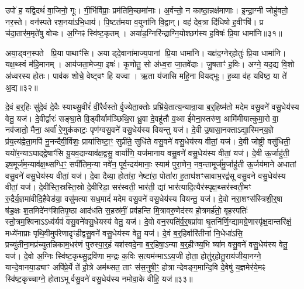 उपो॑ ह॒ यद्वि॒दथं॑ वा॒जिनो॒ गूः।
गी॒र्भिर्विप्राः॒ प्रम॑तिमि॒च्छमा॑नाः।
अ॒र्वन्तो॒ न काष्ठा॒न्नक्ष॑माणाः।
इ॒न्द्रा॒ग्नी जोहु॑वतो॒ नर॒स्ते।
वन॑स्पते रश॒नया॑\-ऽभि॒धाय॑।
पि॒ष्टत॑मया व॒युना॑नि वि॒द्वान्।
वह॑ देव॒त्रा दि॑धिषो ह॒वीꣳषि॑।
प्र च॑दा॒तार॑म॒मृते॑षु वोचः।
अ॒ग्निꣴ स्वि॑ष्ट॒कृतम्।
अया॑ड॒ग्निरि॑न्द्राग्नि॒योश्छग॑स्य ह॒विषः॑ प्रि॒या धामा॑नि॥३१॥

अया॒ड्वन॒स्पते प्रि॒या पाथाꣳ॑सि।
अयाड्दे॒वाना॑माज्य॒पानां प्रि॒या धामा॑नि।
यक्ष॑द॒ग्नेर्‌\mbox{}होतुः॑ प्रि॒या धामा॑नि।
यक्ष॒थ्स्वं म॑हि॒मानम्।
आय॑जता॒मेज्या॒ इषः॑।
कृ॒णोतु॒ सो अ॑ध्व॒रा जा॒तवे॑दाः।
जु॒षताꣳ॑ ह॒विः।
अग्ने॒ यद॒द्य वि॒शो अ॑ध्वरस्य होतः।
पाव॑क शोचे॒ वेष्ट्वꣳ हि यज्वा।
ऋ॒ता य॑जासि महि॒ना वियद्भूः।
ह॒व्या व॑ह यविष्ठ॒ या ते॑ अ॒द्य॥३२॥\anuvakamend[धामा॑नि॒ भूरेकं॑ च]

दे॒वं ब॒र्॒हिः सु॑दे॒वं दे॒वैः स्याथ्सु॒वीरं॑ वी॒रैर्वस्तोर्वृ॒ज्येता॒क्तोः प्रभ्रि॑ये॒तात्य॒न्यान्रा॒या ब॒र्॒हिष्म॑तो मदेम वसु॒वने॑ वसु॒धेय॑स्य वेतु॒ यज॑।
दे॒वीर्द्वारः॑ सङ्घा॒ते वि॒ड्वीर्याम॑ञ्छिथि॒रा ध्रु॒वा दे॒वहू॑तौ व॒थ्स ई॑मेना॒स्तरु॑ण॒ आमि॑मीयात्कुमा॒रो वा॒ नव॑जातो॒ मैना॒ अर्वा॑ रे॒णुक॑काटः॒ पृण॑ग्वसु॒वने॑ वसु॒धेय॑स्य वियन्तु यज॑।
दे॒वी उ॒षासा॒नक्ता\-ऽद्या॒स्मिन्‌य॒ज्ञे प्र॑य॒त्य॑ह्वेता॒मपि॑ नू॒नन्दैवी॒र्विशः॒ प्राया॑सिष्टा॒ꣳ॒ सुप्री॑ते॒ सुधि॑ते वसु॒वने॑ वसु॒धेय॑स्य वीतां॒ यज॑।
दे॒वी जोष्ट्री॒ वसु॑धिती॒ ययो॑र॒न्या\-ऽघाद्द्वेषाꣳ॑सि यू॒यव॒दान्याव॑क्ष॒द्वसु॒ वार्या॑णि॒ यज॑मानाय वसु॒वने॑ वसु॒धेय॑स्य वीतां॒ यज॑।
दे॒वी ऊ॒र्जाहु॑ती॒ इष॒मूर्ज॑म॒न्याव॑क्ष॒थ्सग्धि॒ꣳ॒ सपी॑तिम॒न्या नवे॑न॒ पूर्व॒न्दय॑मानाः॒ स्याम॑ पुरा॒णेन॒ नव॒न्तामूर्ज॑मू॒र्जाहु॑ती ऊ॒र्जय॑माने अधातां वसु॒वने॑ वसु॒धेय॑स्य वीतां॒ यज॑।
दे॒वा दैव्या॒ होता॑रा॒ नेष्टा॑रा॒ पोता॑रा ह॒ताघ॑शꣳसावाभ॒रद्व॑सू वसु॒वने वसु॒धेय॑स्य वीतां॒ यज॑।
दे॒वीस्ति॒स्रस्ति॒स्रो दे॒वीरिडा॒ सर॑स्वती॒ भार॑ती॒ द्यां भार॑त्यादि॒त्यैर॑स्पृक्ष॒थ्सर॑स्वती॒मꣳ रु॒द्रैर्य॒ज्ञमा॑वीदि॒हैवेड॑या॒ वसु॑मत्या सध॒मादं॑ मदेम वसु॒वने॑ वसु॒धेय॑स्य वियन्तु॒ यज॑।
दे॒वो नरा॒शꣳस॑स्त्रिशी॒र्॒षा ष॑ड॒क्षः श॒तमिदे॑नꣳशितिपृ॒ष्ठा आद॑धति स॒हस्र॑मीं॒ प्रव॑हन्ति मि॒त्रावरु॒णेद॑स्य हो॒त्रमर्\mbox{}ह॑तो॒ बृह॒स्पतिः॑ स्तो॒त्रम॒श्विना\-ऽऽध्व॑र्यवं वसु॒वने॑वसु॒धेयस्य॑ वेतु॒ यज॑।
दे॒वो वन॒स्पति॑र्व॒र्॒षप्रा॑वा घृ॒तनि॑र्णि॒ग्द्यामग्रे॒णास्पृ॑क्ष॒दान्तरि॑क्षं॒ मध्ये॑नाप्राः पृथि॒वीमुप॑रेणादृꣳहीद्वसु॒वने॑ वसु॒धेय॑स्य वेतु॒ यज॑।
दे॒वं ब॒र्॒हिर्वारि॑तीनां नि॒धेधा॑ऽसि॒ प्रच्यु॑तीना॒मप्र॑\-च्युतन्निकाम॒धर॑णं पुरुस्पा॒र्॒हं यश॑स्वदे॒ना ब॒र्॒हिषा॒\-ऽन्या ब॒र्॒हीꣳष्य॒भि ष्या॑म वसु॒वने॑ वसु॒धेय॑स्य वेतु॒ यज॑।
दे॒वो अ॒ग्निः स्वि॑ष्ट॒कृथ्सु॒द्रवि॑णा म॒न्द्रः क॒विः स॒त्यम॑न्मा\-ऽऽय॒जी होता॒ होतु॑र्॒होतु॒राय॑जीया॒नग्ने॒ यान्दे॒वानया॒ड्याꣳ अपि॑प्रे॒र्ये ते॑ हो॒त्रे अम॑थ्सत॒ ताꣳ स॑स॒नुषी॒ꣳ॒ होत्रान्देवङ्ग॒मान्दि॒वि दे॒वेषु॑ य॒ज्ञमेर॑ये॒मꣴ स्वि॑ष्ट॒कृच्चाग्ने॒ होता\-ऽभूर्वसु॒वने॑ वसु॒धेय॑स्य नमोवा॒के वीहि॒ यज॑॥३३॥\anuvakamend[यजैकं॑ च]

